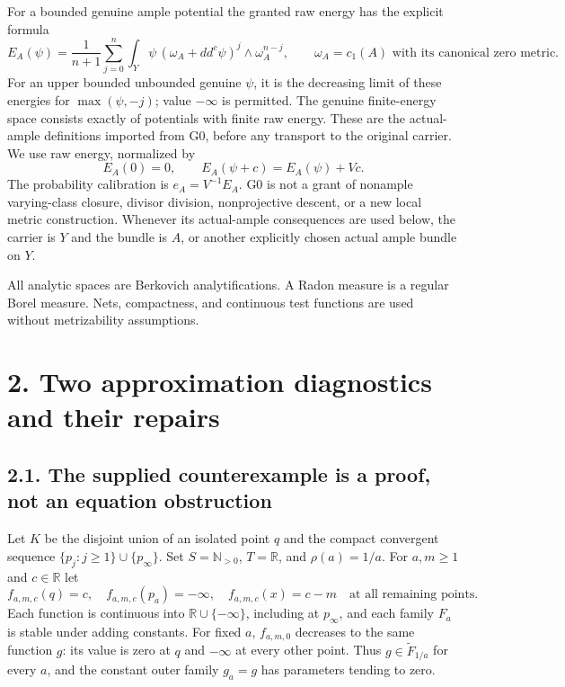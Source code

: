 \documentclass[
  10pt,
]{article}
\begin{document}
For a bounded genuine ample potential the granted raw energy has the
explicit formula \[E_A(\psi)=\frac1{n+1}\sum_{j=0}^n
\int_Y\psi\,(\omega_A+dd^c\psi)^j\wedge\omega_A^{n-j},\qquad
\omega_A=c_1(A)\text{ with its canonical zero metric}.\] For an upper
bounded unbounded genuine \(\psi\), it is the decreasing limit of these
energies for \(\max(\psi,-j)\); value \(-\infty\) is permitted. The
genuine finite-energy space consists exactly of potentials with finite
raw energy. These are the actual-ample definitions imported from G0,
before any transport to the original carrier. We use raw energy,
normalized by \[E_A(0)=0,\qquad E_A(\psi+c)=E_A(\psi)+Vc.\] The
probability calibration is \(e_A=V^{-1}E_A\). G0 is not a grant of
nonample varying-class closure, divisor division, nonprojective descent,
or a new local metric construction. Whenever its actual-ample
consequences are used below, the carrier is \(Y\) and the bundle is
\(A\), or another explicitly chosen actual ample bundle on \(Y\).

All analytic spaces are Berkovich analytifications. A Radon measure is a
regular Borel measure. Nets, compactness, and continuous test functions
are used without metrizability assumptions.

\section{2. Two approximation diagnostics and their
repairs}\label{two-approximation-diagnostics-and-their-repairs}

\subsection{2.1. The supplied counterexample is a proof, not an equation
obstruction}\label{the-supplied-counterexample-is-a-proof-not-an-equation-obstruction}

Let \(K\) be the disjoint union of an isolated point \(q\) and the
compact convergent sequence \(\{p_j:j\geq1\}\cup\{p_\infty\}\). Set
\(S=\mathbb N_{>0}\), \(T=\mathbb R\), and \(\rho(a)=1/a\). For
\(a,m\geq1\) and \(c\in\mathbb R\) let \[
f_{a,m,c}(q)=c,\quad f_{a,m,c}(p_a)=-\infty,\quad
f_{a,m,c}(x)=c-m\quad\text{at all remaining points}.
\] Each function is continuous into \(\mathbb R\cup\{-\infty\}\),
including at \(p_\infty\), and each family \(F_a\) is stable under
adding constants. For fixed \(a\), \(f_{a,m,0}\) decreases to the same
function \(g\): its value is zero at \(q\) and \(-\infty\) at every
other point. Thus \(g\in\widetilde F_{1/a}\) for every \(a\), and the
constant outer family \(g_a=g\) has parameters tending to zero.
\end{document}

